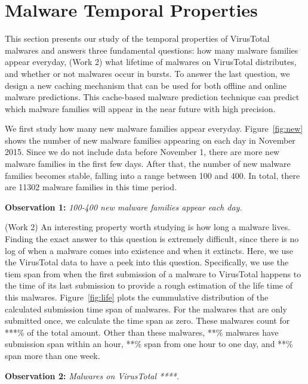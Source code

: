 \section{Malware Temporal Properties}
\label{sec:temporal}

This section presents our study of the temporal properties of VirusTotal malwares
and answers three fundamental questions: 
how many malware families appear everyday, 
{\color{red} (Work 2)
what lifetime of malwares on VirusTotal distributes,  
}
and whether or not malwares occur in bursts.
To answer the last question, we design a new caching mechanism 
that can be used for both offline and online malware predictions.
This cache-based malware prediction technique can predict which malware families will appear in the near future with high precision.



We first study how many new malware families appear everyday. 
Figure~\ref{fig:new} shows the number of new malware families appearing on each day in November 2015. 
Since we do not include data before November 1, 
there are more new malware families in the first few days.
After that, the number of new malware families becomes stable, 
falling into a range between 100 and 400. 
In total, there are 11302 malware families in this time period. 

{\bf Observation 1:} 
{\em 100-400 new malware families appear each day.}

%
%


{\color{red} (Work 2)
An interesting property worth studying is how long a malware lives. 
Finding the exact answer to this question is extremely difficult, since there 
is no log of when a malware comes into existence and when it extincts.
Here, we use the VirusTotal data to have a peek into this question.
Specifically, we use the tiem span from when the first submission of a malware to VirusTotal happens
to the time of its last submission
to provide a rough estimation of the life time of this malwares.
Figure~\ref{fig:life} plots the cummulative distribution of the calculated submission time span of malwares.
For the malwares that are only submitted once, we calculate the time span as zero.
These malwares count for ***\% of the total amount.
Other than these malwares, **\% malwares have submission span within an hour, 
**\% span from one hour to one day, and **\% span more than one week.


{\bf Observation 2:}
{\em Malwares on VirusTotal ****. } %

}


